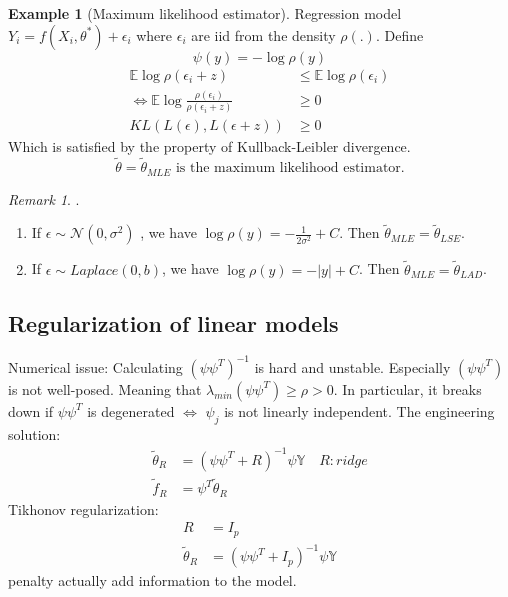 \documentclass[a4paper,12pt, oneside, fleqn]{book}
\theoremstyle{definition}
\newtheorem*{example}{Example}
\theoremstyle{remark}
\newtheorem*{remark}{Remark}
\begin{document}
\begin{example}[Maximum likelihood estimator]
	Regression model $Y_i = f(X_i, \theta^*) + \epsilon_i$ where $\epsilon_i$ are iid from the density $\rho(.)$. Define
	\begin{equation*}
		\psi(y)= -\log \rho(y)
	\end{equation*}
	\begin{align*}
		\mathbb{E} \log \rho(\epsilon_i + z) &\leq \mathbb{E} \log \rho(\epsilon_i) \\
		\Leftrightarrow \mathbb{E} \log \frac{\rho(\epsilon_i)}{\rho(\epsilon_i + z)} &\geq 0 \\
		KL( L(\epsilon), L(\epsilon + z)) &\geq 0
	\end{align*}
	Which is satisfied by the property of Kullback-Leibler divergence.
	\begin{equation*}
		\tilde{\theta} = \tilde{\theta}_{MLE} \text{ is the maximum likelihood estimator.}
	\end{equation*}
	 
\end{example}

\begin{remark}.
\begin{enumerate}
	\item If $\epsilon \sim \mathcal{N}(0, \sigma^2)$ , we have $\log \rho(y) = - \frac{1}{2\sigma^2} + C$. Then $\tilde{\theta}_{MLE} = \tilde{\theta}_{LSE}$.
	\item If $\epsilon \sim Laplace(0, b)$, we have $\log \rho(y) = -|y| + C$. Then $\tilde{\theta}_{MLE} = \tilde{\theta}_{LAD}$.
\end{enumerate}
\end{remark}
 



\subsection{Regularization of linear models}
Numerical issue: Calculating $(\psi \psi^T)^{-1}$ is hard and unstable. Especially $(\psi \psi^T)$ is not well-posed. Meaning that $\lambda_{min} (\psi \psi^T) \geq \rho > 0$. In particular, it breaks down if $\psi \psi^T$ is degenerated $\Leftrightarrow$ $\psi_j$ is not linearly independent. The engineering solution:
\begin{align*}
	\tilde{\theta}_R &= (\psi \psi^T + R)^{-1} \psi \mathbb{Y} \quad R: ridge\\
	\tilde{f}_R &= \psi^T \tilde{\theta}_R 
\end{align*}
Tikhonov regularization:
\begin{align*}
	R &= I_p\\
	\tilde{\theta}_R &= (\psi \psi^T + I_p)^{-1} \psi \mathbb{Y}
\end{align*}
penalty actually add information to the model.
\end{document}
